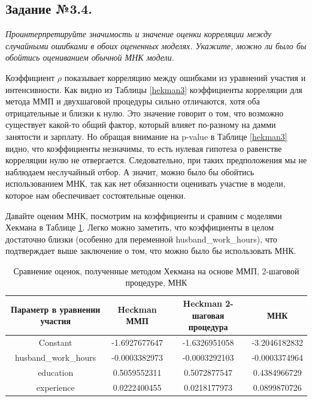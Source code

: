 \documentclass[a4paper,12pt]{article}
\begin{document}
\subsection{Задание №3.4.} 
\textit{Проинтерпретируйте значимость и значение оценки корреляции между
случайными ошибками в обоих оцененных моделях. Укажите, можно ли было бы обойтись
оцениванием обычной МНК модели.}

\vspace{0.2cm}

Коэффициент $\rho$ показывает корреляцию между ошибками из уравнений участия и интенсивности. Как видно из Таблицы \ref{hekman3} коэффициенты корреляции для метода ММП и двухшаговой процедуры сильно отличаются, хотя оба отрицательные и близки к нулю. Это значение говорит о том, что возможно существует какой-то общий фактор, который влияет по-разному на дамми занятости и зарплату. Но обращая внимание на p-value в Таблице \ref{hekman3} видно, что коэффициенты незначимы, то есть нулевая гипотеза о равенстве корреляции нулю не отвергается. Следовательно, при таких предположения мы не наблюдаем неслучайный отбор. А значит, можно было бы обойтись использованием МНК, так как нет обязанности оценивать участие в модели,  которое нам обеспечивает состоятельные оценки.

Давайте оценим МНК, посмотрим на коэффициенты и сравним с моделями Хекмана в Таблице \ref{hekman4}. Легко можно заметить, что коэффициенты в целом достаточно близки (особенно для переменной husband\_work\_hours), что подтверждает выше заключение о том, что можно было бы использовать МНК.

\begin{table}[!h]
	\caption{Сравнение оценок, полученные методом Хекмана на основе ММП, 2-шаговой процедуре, МНК}
	\label{hekman4}
	\centering
	\small
	\begin{tabular}{|c|c|c|c|}
		\hline
		Параметр в уравнении участия& Heckman  ММП & Heckman 2-шаговая процедура&МНК \\ 
		\hline
		Constant &-1.6927677647 &-1.6326951058&-3.2046182832\\
		\hline
		husband\_work\_hours     & -0.0003382973 &-0.0003292103&-0.0003374964\\
		\hline
		education         &0.5059552311 & 0.5072877547&0.4384966729\\
		\hline
		experience        &0.0222400455 & 0.0218177973&0.0899870726\\
		\hline
	\end{tabular}
\end{table}
\end{document}
